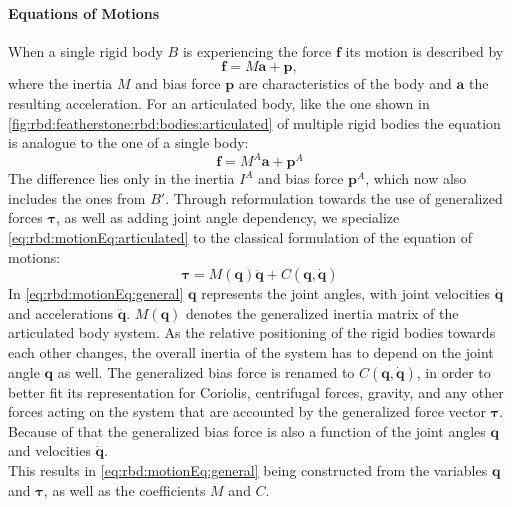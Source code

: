 \paragraph{Equations of Motions}
When a single rigid body $B$ is experiencing the force $\bm f$ its motion is described by
\begin{equation}
    \bm f = M \bm a + \bm p \label{eq:rbd:motionEq:rigid},
\end{equation}
where the inertia $M$ and bias force $\bm p$ are characteristics of the body and $\bm a$ the resulting acceleration.
For an articulated body, like the one shown in \cref{fig:rbd:featherstone:rbd:bodies:articulated} of multiple rigid bodies the equation is analogue to the one of a single body:
\begin{equation}
    \bm f = M^A \bm a + \bm p^A \label{eq:rbd:motionEq:articulated}
\end{equation}
The difference lies only in the inertia $I^A$ and bias force $\bm p^A$, which now also includes the ones from $B'$.
Through reformulation towards the use of generalized forces $\bm \tau$, as well as adding joint angle dependency, we specialize \cref{eq:rbd:motionEq:articulated} to the classical formulation of the equation of motions:
\begin{equation}
  \bm \tau = M(\bm q)\bm{\ddot q}+C(\bm q, \bm{\dot q}) \label{eq:rbd:motionEq:general}
\end{equation}
In \cref{eq:rbd:motionEq:general} $\bm q$ represents the joint angles, with joint velocities $\bm{\dot q}$ and accelerations $\bm{\ddot q}$.
$M(\bm q)$ denotes the generalized inertia matrix of the articulated body system.
As the relative positioning of the rigid bodies towards each other changes, the overall inertia of the system has to depend on the joint angle $\bm q$ as well.
The generalized bias force is renamed to $C(\bm q, \bm{\dot q})$, in order to better fit its representation for Coriolis, centrifugal forces, gravity, and any other forces acting on the system that are accounted by the generalized force vector $\bm \tau$.
Because of that the generalized bias force is also a function of the joint angles $\bm q$ and velocities $\bm{\dot q}$.
\\
This results in \cref{eq:rbd:motionEq:general} being constructed from the variables $\bm q$ and $\bm \tau$, as well as the coefficients $M$ and $C$.

